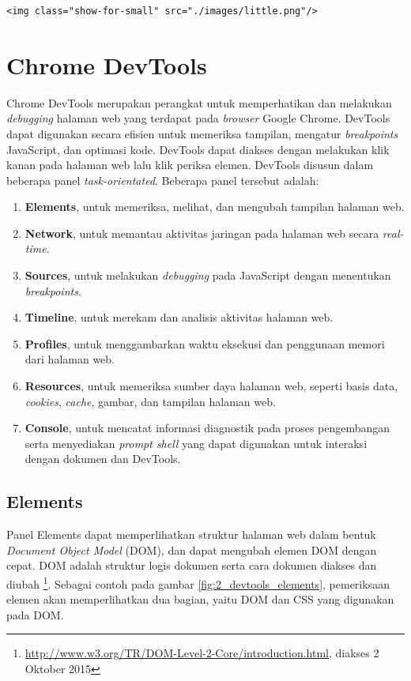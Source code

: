\begin{lstlisting}[caption=Menggunakan kelas yang sudah disediakan dari Foundation,label = {lst_2_zurb_contoh}]
	<img class="show-for-small" src="./images/little.png"/>
\end{lstlisting}

\section{Chrome DevTools}
\label{sec:devtools}
Chrome DevTools\cite{devtools} merupakan perangkat untuk memperhatikan dan melakukan \textit{debugging} halaman web yang terdapat pada \textit{browser} Google Chrome. DevTools dapat digunakan secara efisien untuk memeriksa tampilan, mengatur \textit{breakpoints} JavaScript, dan optimasi kode. DevTools dapat diakses dengan melakukan klik kanan pada halaman web lalu klik periksa elemen. DevTools disusun dalam beberapa panel \textit{task-orientated}. Beberapa panel tersebut adalah:

\begin{enumerate}
	\item \textbf{Elements}, untuk memeriksa, melihat, dan mengubah tampilan halaman web.
	\item \textbf{Network}, untuk memantau aktivitas jaringan pada halaman web secara \textit{real-time}.
	\item \textbf{Sources}, untuk melakukan \textit{debugging} pada JavaScript dengan menentukan \textit{breakpoints}.
	\item \textbf{Timeline}, untuk merekam dan analisis aktivitas halaman web.
	\item \textbf{Profiles}, untuk menggambarkan waktu eksekusi dan penggunaan memori dari halaman web.
	\item \textbf{Resources}, untuk memeriksa sumber daya halaman web, seperti basis data, \textit{cookies}, \textit{cache}, gambar, dan tampilan halaman web.
	\item \textbf{Console}, untuk mencatat informasi diagnostik pada proses pengembangan serta menyediakan \textit{prompt shell} yang dapat digunakan untuk interaksi dengan dokumen dan DevTools.
\end{enumerate}

\subsection{Elements}
Panel Elements dapat memperlihatkan struktur halaman web dalam bentuk \textit{Document Object Model} (DOM), dan dapat mengubah elemen DOM dengan cepat. DOM adalah struktur logis dokumen serta cara dokumen diakses dan diubah \footnote{\url{http://www.w3.org/TR/DOM-Level-2-Core/introduction.html}, diakses 2 Oktober 2015}. Sebagai contoh pada gambar \ref{fig:2_devtools_elements}, pemeriksaan elemen akan memperlihatkan dua bagian, yaitu DOM dan CSS yang digunakan pada DOM.

